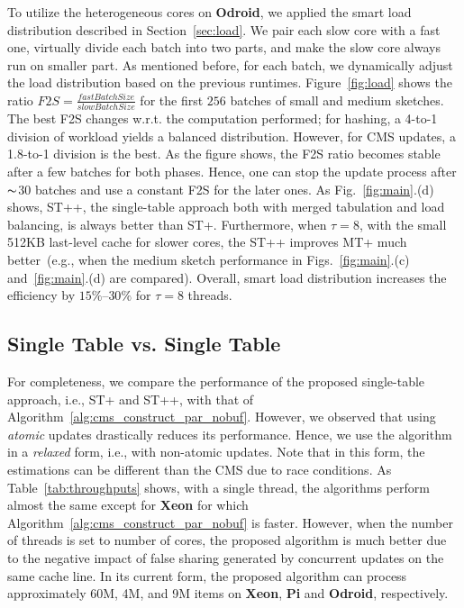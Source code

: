 \documentclass[runningheads]{llncs}
\begin{document}
To utilize the heterogeneous cores on {\bf Odroid}, we applied the smart load distribution described in Section~\ref{sec:load}. We pair each slow core with a fast one, virtually divide each batch into two parts, and make the slow core always run on smaller part. 
As mentioned before, for each batch, we dynamically adjust the load distribution based on the previous runtimes. Figure~\ref{fig:load} shows the ratio $F2S = \frac{fastBatchSize}{slowBatchSize}$ for the first $256$ batches of small and medium sketches. The best F2S changes w.r.t. the computation performed; for hashing, a 4-to-1 division of workload yields a balanced distribution. However, for CMS updates, a 1.8-to-1 division is the best. As the figure shows, the F2S ratio becomes stable after a few batches for both phases. Hence, one can stop the update process after $\thicksim$$30$  batches and use a constant F2S for the later ones. As Fig.~\ref{fig:main}.(d) shows, ST++, the single-table approach both with merged tabulation and load balancing, is always better than ST+. Furthermore, when $\tau = 8$, with the small 512KB last-level cache for slower cores, the ST++ improves MT+ much better~(e.g., when the medium sketch performance in Figs.~\ref{fig:main}.(c) and~\ref{fig:main}.(d) are compared).  Overall, smart load distribution increases the efficiency by $15\%$--$30\%$ for $\tau = 8$ threads.  

\subsection{Single Table vs. Single Table}

For completeness, we compare the performance of the proposed single-table approach, i.e., ST+ and ST++, with that of Algorithm~\ref{alg:cms_construct_par_nobuf}. However, we observed that using {\em atomic} updates drastically reduces its performance. Hence, we use the algorithm in a {\em relaxed} form, i.e., with non-atomic updates. Note that in this form, the estimations can be different than the CMS due to race conditions. As Table~\ref{tab:throughputs} shows, with a single thread, the algorithms perform almost the same except for {\bf Xeon} for which Algorithm~\ref{alg:cms_construct_par_nobuf} is faster. However, when the number of threads is set to number of cores, the proposed algorithm is much better due to the negative impact of false sharing generated by concurrent updates on the same cache line. In its current form, the proposed algorithm can process approximately 60M, 4M, and 9M items on  {\bf Xeon},  {\bf Pi} and  {\bf Odroid}, respectively.      
\vspace{-2ex}
\end{document}
